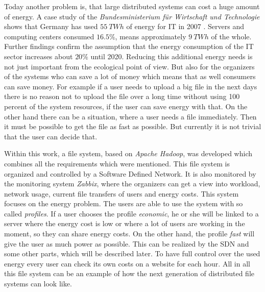 Today another problem is, that large distributed systems can cost a huge amount of energy. A case study of the \textit{Bundesministerium f\"ur Wirtschaft und Technologie} shows that Germany has used $55\ TWh$ of energy for IT in 2007 \cite{bmwi}. Servers and computing centers consumed $16.5 \%$, means approximately $9\ TWh$ of the whole. Further findings confirm the assumption that the energy consumption of the IT sector increases about $20 \%$ until 2020. Reducing this additional energy needs is not just important from the ecological point of view. But also for the organizers of the systems who can save a lot of money which means that as well consumers can save money. For example if a user needs to upload a big file in the next days there is no reason not to upload the file over a long time without using 100 percent of the system resources, if the user can save energy with that. On the other hand there can be a situation, where a user needs a file immediately. Then it must be possible to get the file as fast as possible. But currently it is not trivial that the user can decide that.  

Within this work, a file system, based on \textit{Apache Hadoop}, was developed which combines all the requirements which were mentioned. This file system is organized and controlled by a Software Defined Network. It is also monitored by the monitoring system \textit{Zabbix}, where the organizers can get a view into workload, network usage, current file transfers of users and energy costs. This system focuses on the energy problem. The users are able to use the system with so called \textit{profiles}. If a user chooses the profile \textit{economic}, he or she will be linked to a server where the energy cost is low or where a lot of users are working in the moment, so they can share energy costs. On the other hand, the profile \textit{fast} will give the user as much power as possible. This can be realized by the SDN and some other parts, which will be described later. To have full control over the used energy every user can check its own costs on a website for each hour. All in all this file system can be an example of how the next generation of distributed file systems can look like.             
